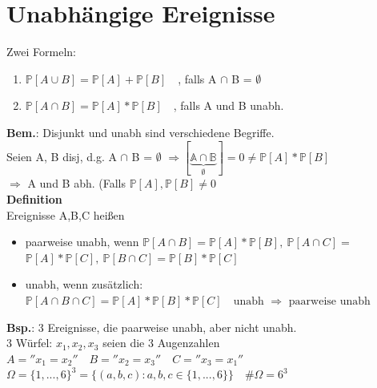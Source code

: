 \section{Unabhängige Ereignisse}
Zwei Formeln:
\begin{enumerate}
	\item $\mathds{P}[A\cup B] = \mathds{P}[A]+\mathds{P}[B] \quad$, falls A $\cap$ B = $\emptyset$
	\item $\mathds{P}[A\cap B] = \mathds{P}[A]*\mathds{P}[B] \quad$, falls A und B unabh.
\end{enumerate}
\textbf{Bem.}: Disjunkt und unabh sind verschiedene Begriffe.\\
Seien A, B disj, d.g. A $\cap$ B = $\emptyset$ $\Rightarrow \mathds{[\underbrace{A \cap B}_\emptyset]}= 0 \neq \mathds{P}[A]*\mathds{P}[B]$\\$\Rightarrow$ A und B abh. (Falls $\mathds{P}[A], \mathds{P}[B] \neq 0$\medskip\\
\textbf{Definition}\\
Ereignisse A,B,C heißen
\begin{itemize}
	\item paarweise unabh, wenn $\mathds{P}[A\cap B] = \mathds{P}[A]*\mathds{P}[B],\: \mathds{P}[A\cap C] =$\\$ \mathds{P}[A]*\mathds{P}[C],\:\mathds{P}[B \cap C]=\mathds{P}[B]*\mathds{P}[C]$
	\item unabh, wenn zusätzlich: $\mathds{P}[A\cap B \cap C] = \mathds{P}[A]*\mathds{P}[B]*\mathds{P}[C] \quad \text{unabh } \Rightarrow \text{ paarweise unabh}$
\end{itemize}
\textbf{Bsp.}: 3 Ereignisse, die paarweise unabh, aber nicht unabh.\\
3 Würfel: $x_1,x_2,x_3$ seien die 3 Augenzahlen
\\$A = ''x_1 = x_2'' \quad B = ''x_2 = x_3'' \quad C = ''x_3 = x_1''$\smallskip\\
$\Omega = \{1,...,6\}^3 = \{(a,b,c):a,b,c \in \{1,...,6\}\} \quad \# \Omega = 6^3$\smallskip\\
